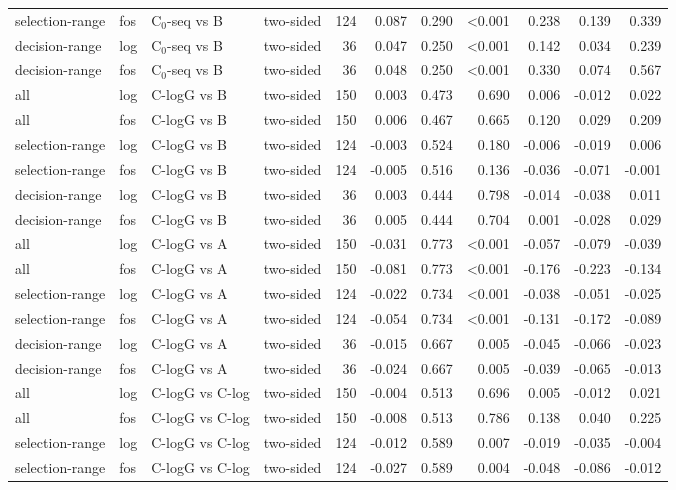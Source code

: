 \begin{longtable}{llllrrrrrrr}
selection-range & fos & C$_0$-seq vs B & two-sided & 124 & 0.087 & 0.290 & <0.001 & 0.238 & 0.139 & 0.339 \\
decision-range & log & C$_0$-seq vs B & two-sided & 36 & 0.047 & 0.250 & <0.001 & 0.142 & 0.034 & 0.239 \\
decision-range & fos & C$_0$-seq vs B & two-sided & 36 & 0.048 & 0.250 & <0.001 & 0.330 & 0.074 & 0.567 \\
all & log & C-logG vs B & two-sided & 150 & 0.003 & 0.473 & 0.690 & 0.006 & -0.012 & 0.022 \\
all & fos & C-logG vs B & two-sided & 150 & 0.006 & 0.467 & 0.665 & 0.120 & 0.029 & 0.209 \\
selection-range & log & C-logG vs B & two-sided & 124 & -0.003 & 0.524 & 0.180 & -0.006 & -0.019 & 0.006 \\
selection-range & fos & C-logG vs B & two-sided & 124 & -0.005 & 0.516 & 0.136 & -0.036 & -0.071 & -0.001 \\
decision-range & log & C-logG vs B & two-sided & 36 & 0.003 & 0.444 & 0.798 & -0.014 & -0.038 & 0.011 \\
decision-range & fos & C-logG vs B & two-sided & 36 & 0.005 & 0.444 & 0.704 & 0.001 & -0.028 & 0.029 \\
all & log & C-logG vs A & two-sided & 150 & -0.031 & 0.773 & <0.001 & -0.057 & -0.079 & -0.039 \\
all & fos & C-logG vs A & two-sided & 150 & -0.081 & 0.773 & <0.001 & -0.176 & -0.223 & -0.134 \\
selection-range & log & C-logG vs A & two-sided & 124 & -0.022 & 0.734 & <0.001 & -0.038 & -0.051 & -0.025 \\
selection-range & fos & C-logG vs A & two-sided & 124 & -0.054 & 0.734 & <0.001 & -0.131 & -0.172 & -0.089 \\
decision-range & log & C-logG vs A & two-sided & 36 & -0.015 & 0.667 & 0.005 & -0.045 & -0.066 & -0.023 \\
decision-range & fos & C-logG vs A & two-sided & 36 & -0.024 & 0.667 & 0.005 & -0.039 & -0.065 & -0.013 \\
all & log & C-logG vs C-log & two-sided & 150 & -0.004 & 0.513 & 0.696 & 0.005 & -0.012 & 0.021 \\
all & fos & C-logG vs C-log & two-sided & 150 & -0.008 & 0.513 & 0.786 & 0.138 & 0.040 & 0.225 \\
selection-range & log & C-logG vs C-log & two-sided & 124 & -0.012 & 0.589 & 0.007 & -0.019 & -0.035 & -0.004 \\
selection-range & fos & C-logG vs C-log & two-sided & 124 & -0.027 & 0.589 & 0.004 & -0.048 & -0.086 & -0.012 \\

\end{longtable}
